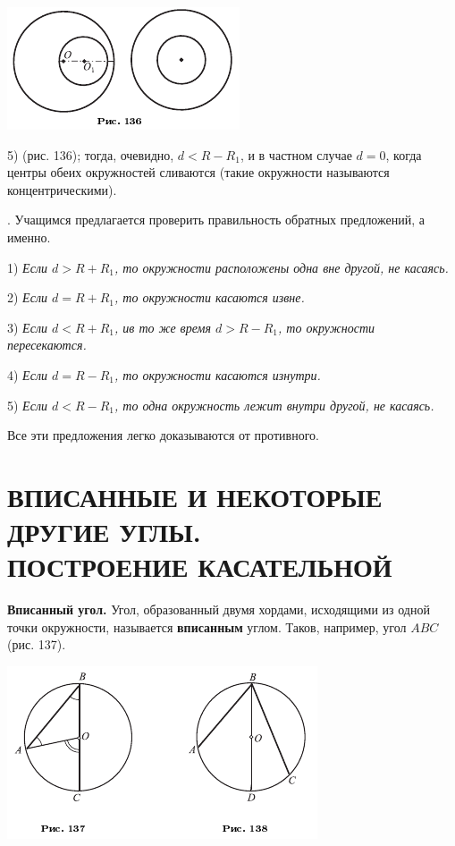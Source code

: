 \documentclass[oneside]{book}
\begin{document}
\includegraphics{pics/ris-136}

5)  (рис. 136);
тогда, очевидно, $d<R-R_1$, и в частном случае $d= 0$, когда центры обеих окружностей сливаются (такие окружности называются концентрическими).

.
Учащимся предлагается проверить правильность обратных предложений, а именно.

1) \emph{Если $d>R+R_1$, то окружности расположены одна вне другой, не касаясь.}

2) \emph{Если $d=R+R_1$, то окружности касаются извне.}

3) \emph{Если $d<R+R_1$, ив то же время $d>R-R_1$, то окружности пересекаются.}

4) \emph{Если $d=R-R_1$, то окружности касаются изнутри.}

5) \emph{Если $d<R-R_1$, то одна окружность лежит внутри другой, не касаясь.}

Все эти предложения легко доказываются от противного.

\section{ВПИСАННЫЕ И НЕКОТОРЫЕ ДРУГИЕ УГЛЫ.\\
ПОСТРОЕНИЕ КАСАТЕЛЬНОЙ}

\textbf{Вписанный угол.}
Угол, образованный двумя хордами, исходящими из одной точки окружности, называется \textbf{вписанным} углом.
Таков, например, угол $ABC$ (рис. 137).

\includegraphics{pics/ris-137-138}
\end{document}
